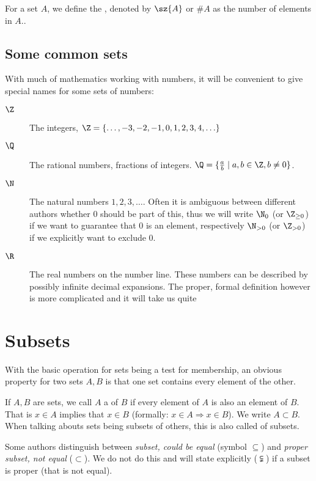 For a set $A$, we define the , denoted by $\sz{A}$ or
$\# A$ as the number of elements in $A$..

\subsection{Some common sets}

With much of mathematics working with numbers, it will be convenient to give
special names for some sets of numbers:
\begin{description}
\item[$\Z$] The integers, $\Z=\{\ldots,-3,-2,-1,0,1,2,3,4,\ldots\}$
\item[$\Q$] The rational numbers, fractions of integers.
$\Q=\{\frac{a}{b}\mid a,b\in\Z, b\not=0\}$.
\item[$\N$] The natural numbers $1,2,3,\ldots$. Often it is ambiguous
between different authors whether $0$ should be part of this, thus we will
write $\N_0$ (or $\Z_{\ge 0}$) if we want to guarantee that $0$ is an
element, respectively $\N_{>0}$ (or $\Z_{>0}$) if we explicitly want to
exclude $0$.
\item[$\R$] The real numbers on the number line. These numbers can be
described by possibly infinite decimal expansions. The proper, formal
definition however is more complicated and it will take us quite 
\end{description}


\section{Subsets}
\label{secsubsets}

With the basic operation for sets being a test for membership, an obvious
property for two sets $A,B$ is that one set contains every element of the
other.

\begin{defn}
If $A,B$ are sets, we call $A$ a  of $B$ if every element of
$A$ is also an element of $B$. That is $x\in A$ implies that $x\in B$
(formally: $x\in A\Rightarrow x\in B$). We write $A\subset B$.
When talking abouts sets being subsets of others, this is also called
 of subsets.
\end{defn}
\begin{note}
Some authors distinguish between {\em subset, could be equal} (symbol
$\subseteq$) and {\em proper subset, not equal} ($\subset$). We do not do
this and will state explicitly ($\subsetneqq$) if a subset is 
proper (that is not equal).
\end{note}

